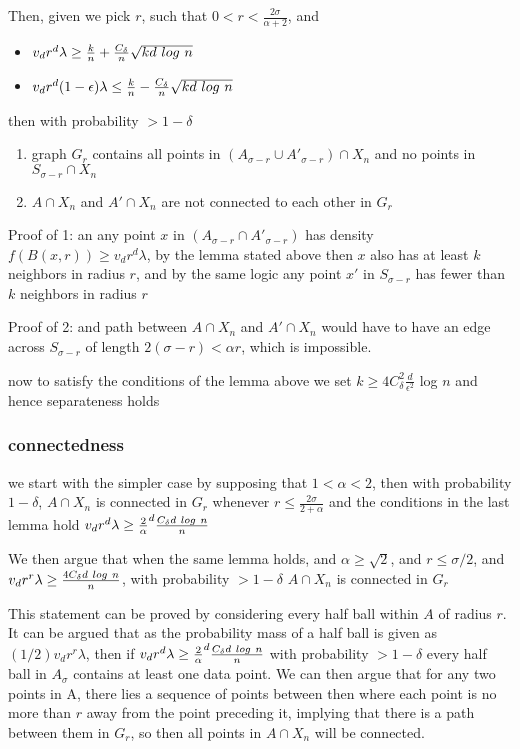\documentclass{article}
\begin{document}
Then, given we pick $r$, such that $0 < r < \frac{2\sigma}{\alpha+2}$, and 
\begin{itemize}
  \item $v_dr^d\lambda \geq \frac{k}{n} + \frac{C_{\delta}}{n}\sqrt{kd \-\ log \-\ n}$
  \item $v_dr^d(1-\epsilon)\lambda \leq \frac{k}{n} - \frac{C_{\delta}}{n}\sqrt{kd \-\ log \-\ n}$
\end{itemize}
then with probability $> 1-\delta$
\begin{enumerate}
    \item graph $G_r$ contains all points in $(A_{\sigma-r} \cup A'_{\sigma-r}) \cap X_n$ and no points in $S_{\sigma - r } \cap X_n$
    \item $A \cap X_n $ and $A' \cap X_n$ are not connected to each other in $G_r$
\end{enumerate}

Proof of 1: an any point $x$ in $(A_{\sigma-r} \cap A'_{\sigma - r})$ has density $f(B(x, r)) \geq v_dr^d\lambda$, by the lemma stated above then $x$ also has at least $k$ neighbors in radius $r$, and by the same logic any point $x'$ in $S_{\sigma-r}$ has fewer than $k$ neighbors in radius $r$

Proof of 2: and path between $A \cap X_n $ and $A' \cap X_n$ would have to have an edge across $S_{\sigma - r}$ of length $2(\sigma-r) < \alpha r$, which is impossible.

now to satisfy the conditions of the lemma above we set $k \geq 4C^2_{\delta}\frac{d}{\epsilon^2}$ log $n$ and hence separateness holds

\subsubsection{connectedness}

we start with the simpler case by supposing that $1 < \alpha < 2$, then with probability $1 - \delta$, $A \cap X_n$ is connected in $G_r$ whenever $r \leq \frac{2\sigma}{2+ \alpha}$ and the conditions in the last lemma hold $v_dr^d\lambda \geq \frac{2}{\alpha}^d\frac{C_{\delta} d \-\ log \-\ n}{n}$

We then argue that when the same lemma holds, and $\alpha \geq \sqrt{2}$, and $r \leq \sigma/2$, and $v_dr^r\lambda \geq \frac{4C_{\delta}d \-\ log \-\ n}{n}$, with probability $> 1- \delta$ $A\cap X_n$ is connected in $G_r$

This statement can be proved by considering every half ball within $A$ of radius $r$.  It can be argued that as the probability mass of a half ball is given as $(1/2)v_dr^r\lambda$, then if $v_dr^d\lambda \geq \frac{2}{\alpha}^d\frac{C_{\delta} d \-\ log \-\ n}{n}$ with probability $> 1 - \delta$ every half ball in $A_{\sigma}$ contains at least one data point.  We can then argue that for any two points in A, there lies a sequence of points between then where each point is no more than $r$ away from the point preceding it, implying that there is a path between them in $G_r$, so then all points in $A \cap X_n$ will be connected.
\end{document}
